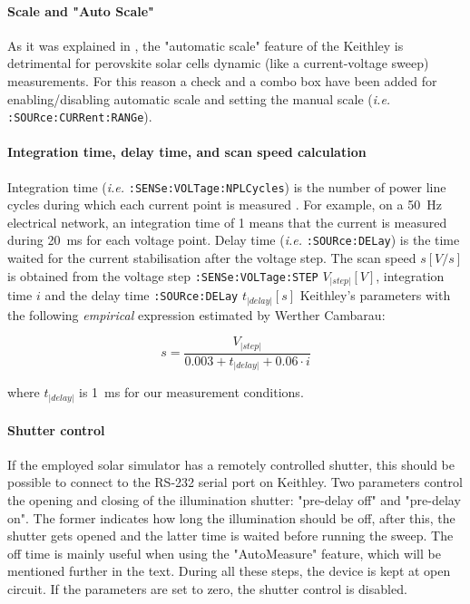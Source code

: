 		\paragraph{Scale and "Auto Scale"}
		As it was explained in , the "automatic scale" feature of the Keithley is detrimental for perovskite solar cells dynamic (like a current\hyp{}voltage sweep) measurements.
		For this reason a check and a combo box have been added for enabling\-/disabling automatic scale and setting the manual scale (\textsl{i.e.} \texttt{:SOURce:\-CURRent:\-RANGe}).
		
		\paragraph{Integration time, delay time, and scan speed calculation}
		Integration time (\textsl{i.e.} \texttt{:SENSe:\-VOLTage:\-NPLCycles}) is the number of power line cycles during which each current point is measured \cite{KeithleyInstruments2011}.
		For example, on a \SI{50}{\Hz} electrical network, an integration time of 1 means that the current is measured during \SI{20}{\ms} for each voltage point.
		Delay time (\textsl{i.e.} \texttt{:SOURce:\-DELay}) is the time waited for the current stabilisation after the voltage step.
The scan speed $s[V/s]$ is obtained from the voltage step \texttt{:SENSe:\-VOLTage:\-STEP} $V_|step|[V]$, integration time $i$ and the delay time \texttt{:SOURce:\-DELay} $t_|delay|[s]$ Keithley's parameters with the following \textit{empirical} expression estimated by Werther Cambarau:

\begin{equation}
s = \frac{V_|step|}{0.003 + t_|delay| + 0.06 \cdot i}
\end{equation}

where $t_|delay|$ is \SI{1}{\ms} for our measurement conditions.

\paragraph{Shutter control}
If the employed solar simulator has a remotely controlled shutter, this should be possible to connect to the RS-232 serial port on Keithley.
Two parameters control the opening and closing of the illumination shutter: "pre-delay off" and "pre-delay on".
The former indicates how long the illumination should be off, after this, the shutter gets opened and the latter time is waited before running the sweep.
The off time is mainly useful when using the "AutoMeasure" feature, which will be mentioned further in the text.
During all these steps, the device is kept at open circuit.
If the parameters are set to zero, the shutter control is disabled.

